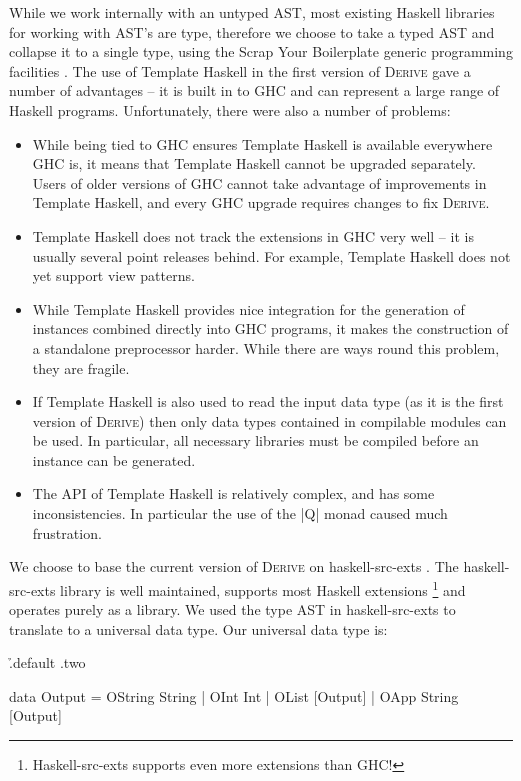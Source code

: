 \documentclass[preprint,draft]{sigplanconf}
\newcommand{\derive}{\textsc{Derive}}
\begin{document}
While we work internally with an untyped AST, most existing Haskell libraries for working with AST's are type, therefore we choose to take a typed AST and collapse it to a single type, using the Scrap Your Boilerplate generic programming facilities \cite{lammel:syb}. The use of Template Haskell in the first version of \derive{} gave a number of advantages -- it is built in to GHC and can represent a large range of Haskell programs. Unfortunately, there were also a number of problems:

\begin{itemize}
\item While being tied to GHC ensures Template Haskell is available everywhere GHC is, it means that Template Haskell cannot be upgraded separately. Users of older versions of GHC cannot take advantage of improvements in Template Haskell, and every GHC upgrade requires changes to fix \derive{}.
\item Template Haskell does not track the extensions in GHC very well -- it is usually several point releases behind. For example, Template Haskell does not yet support view patterns.
\item While Template Haskell provides nice integration for the generation of instances combined directly into GHC programs, it makes the construction of a standalone preprocessor harder. While there are ways round this problem, they are fragile.
\item If Template Haskell is also used to read the input data type (as it is the first version of \derive{}) then only data types contained in compilable modules can be used. In particular, all necessary libraries must be compiled before an instance can be generated.
\item The API of Template Haskell is relatively complex, and has some inconsistencies. In particular the use of the |Q| monad caused much frustration.
\end{itemize}

We choose to base the current version of \derive{} on haskell-src-exts \cite{haskell_src_exts}. The haskell-src-exts library is well maintained, supports most Haskell extensions \footnote{Haskell-src-exts supports even more extensions than GHC!} and operates purely as a library. We used the type AST in haskell-src-exts to translate to a universal data type. Our universal data type is:

\h{.default .two}\begin{code}
data Output  =  OString String
             |  OInt Int
             |  OList [Output]
             |  OApp String [Output]
\end{code}
\end{document}
